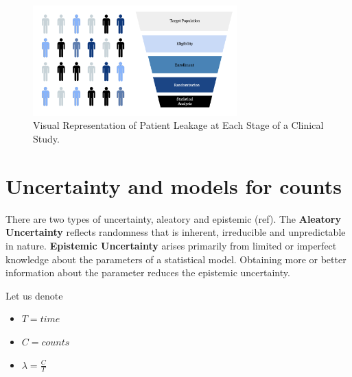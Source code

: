 \begin{figure}[h]
  \centering
  \includegraphics[width=0.7\textwidth]{fig_2_1_b.png}
  \caption{Visual Representation of Patient Leakage at Each Stage of a Clinical Study.  \citep{piantadosi2022principles, whelan2018high, bogin2022lasagna}}
  \label{fig:2_1_b}
\end{figure}

\section{Uncertainty and models for counts}

There are two types of uncertainty, aleatory and epistemic (ref). The \textbf{Aleatory Uncertainty} reflects randomness that is inherent, irreducible and unpredictable in nature. \textbf{Epistemic Uncertainty} arises primarily from limited or imperfect knowledge about the parameters of a statistical model. Obtaining more or better information about the parameter reduces the epistemic uncertainty. 

Let us denote

\begin{itemize}
\item $T=time$
\item $C=counts$
\item $\lambda=\frac{C}{T}$
\end{itemize}

\begin{table}[h!]
\centering
{}
\caption{Aleatory and epistemic uncertainty in accrual shown by different models for counts.}
\label{tab:count_modeling}
\end{table}

